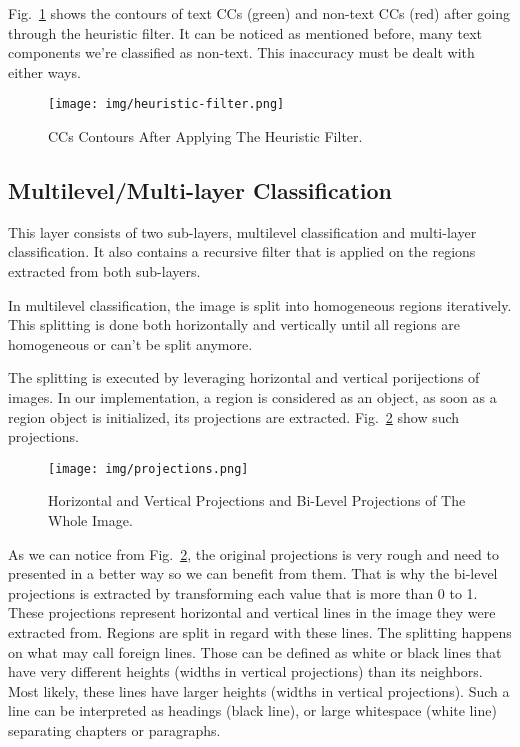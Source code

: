 \documentclass[conference]{IEEEtran}
\begin{document}
    Fig.~\ref{img:heuristic-filter} shows the contours of text CCs (green) and non-text CCs (red) after going through the heuristic filter.
    It can be noticed as mentioned before, many text components we're classified as non-text.
    This inaccuracy must be dealt with either ways.

    \begin{figure}[htbp]
        \centerline{\texttt{[image: img/heuristic-filter.png]}}
        \caption{CCs Contours After Applying The Heuristic Filter.}
        \label{img:heuristic-filter}
    \end{figure}

    \subsection{Multilevel/Multi-layer Classification}

    This layer consists of two sub-layers, multilevel classification and multi-layer classification.
    It also contains a recursive filter that is applied on the regions extracted from both sub-layers.

    In multilevel classification, the image is split into homogeneous regions iteratively.
    This splitting is done both horizontally and vertically until all regions are homogeneous or can't
    be split anymore.

    The splitting is executed by leveraging horizontal and vertical porijections of images. In our
    implementation, a region is considered as an object, as soon as a region object is initialized,
    its projections are extracted. Fig.~\ref{img:projections} show such projections.

    \begin{figure}[htbp]
        \centerline{\texttt{[image: img/projections.png]}}
        \caption{Horizontal and Vertical Projections and Bi-Level Projections of The Whole Image.}
        \label{img:projections}
    \end{figure}

    As we can notice from Fig.~\ref{img:projections}, the original projections is very rough and need to
    presented in a better way so we can benefit from them.
    That is why the bi-level projections is extracted by transforming each value that is more than 0 to 1.
    These projections represent horizontal and vertical lines in the image they were extracted from.
    Regions are split in regard with these lines. The splitting happens on what may call foreign lines.
    Those can be defined as white or black lines that have very different heights (widths in vertical projections)
    than its neighbors. Most likely, these lines have larger heights (widths in vertical projections). Such a line
    can be interpreted as headings (black line), or large whitespace (white line) separating chapters or paragraphs.
\end{document}
